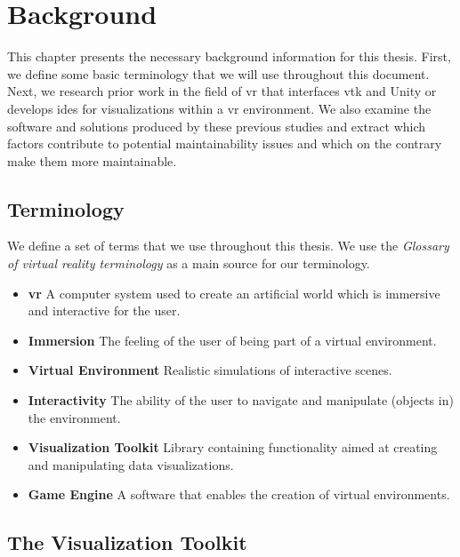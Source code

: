 \chapter{Background}
\label{ch:background}

This chapter presents the necessary background information for this thesis. First, we define some basic terminology that we will use throughout this document. Next, we research prior work in the field of \acrshort{vr} that interfaces \acrshort{vtk} and Unity or develops \acrshort{ide}s for visualizations within a \acrshort{vr} environment. We also examine the software and solutions produced by these previous studies and extract which factors contribute to potential maintainability issues and which on the contrary make them more maintainable. 

\section{Terminology}

We define a set of terms that we use throughout this thesis. We use the \textit{Glossary of virtual reality terminology} \cite{manetta1995glossary} as a main source for our terminology.

\begin{itemize}[leftmargin=1.5truecm]
    \setlength{\itemindent}{-1truecm}
    \item[] \textbf{\acrfull{vr}} A computer system used to create an artificial world which is immersive and interactive for the user.
    \item[] \textbf{Immersion} The feeling of the user of being part of a virtual environment.
    \item[] \textbf{Virtual Environment} Realistic simulations of interactive scenes.
    \item[] \textbf{Interactivity} The ability of the user to navigate and manipulate (objects in) the environment.
    \item[] \textbf{Visualization Toolkit} Library containing functionality aimed at creating and manipulating data visualizations.
    \item[] \textbf{Game Engine} A software that enables the creation of virtual environments.
\end{itemize}

\section{The Visualization Toolkit}

